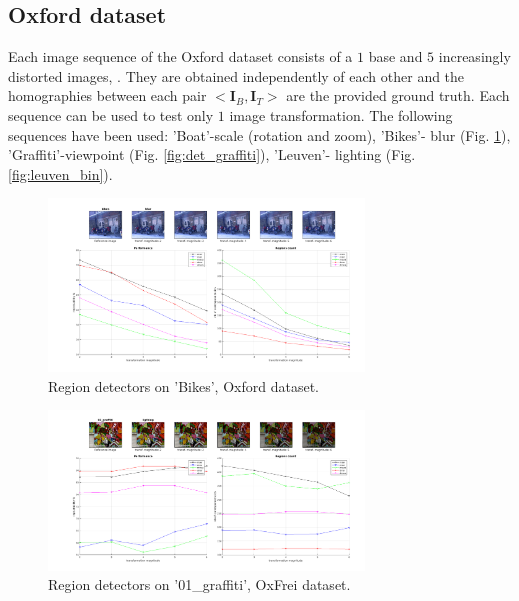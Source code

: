 \documentclass{article}
\def\I{{\mathbf I}}
\begin{document}
\subsection{Oxford dataset}
\label{ssec:oxford}
Each image sequence of the Oxford dataset consists of a $1$ base and $5$ increasingly distorted images, \cite{Mikolajczyk:2005}. They are obtained independently of each other and the homographies between each pair $<\I_B,\I_T>$ are the provided  ground truth. Each sequence can be used to test only $1$ image transformation. The following sequences have been used: 'Boat'-scale (rotation and zoom), 'Bikes'- blur (Fig. \ref{fig:det_bikes}), 'Graffiti'-viewpoint (Fig. \ref{fig:det_graffiti}), 'Leuven'- lighting (Fig. \ref{fig:leuven_bin}).

\begin{figure}[htb]
\centering
\begin{minipage}[b]{.99\linewidth}
  \centering
  \centerline{\includegraphics[width=8.4cm]{./Figs/repeatability_all_affine_bikes_blur}}
\end{minipage}
\hfill
\vspace{-0.25cm}
\caption{Region detectors on 'Bikes', Oxford dataset.}
\label{fig:det_bikes}
%
\end{figure}
\vspace{-0.25cm}
\begin{figure}[htb]
\centering
\begin{minipage}[b]{.99\linewidth}
  \centering
 \centerline{\includegraphics[width=8.4cm]{./Figs/repeatability_all_combined_01_graffiti_ligthing_good}}
\end{minipage}
\hfill
\vspace{-0.25cm}
\caption{Region detectors on '01\_graffiti', OxFrei dataset.}
\label{fig:det_frei}
%
\end{figure}
\end{document}
